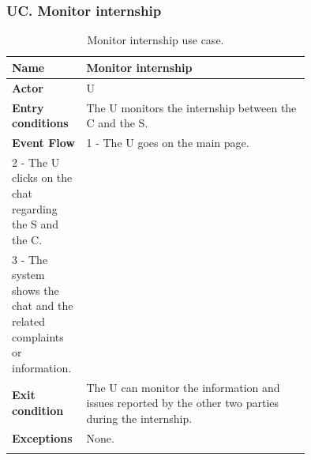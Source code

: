 \subsubsection*{UC\cuc . Monitor internship}
\begin{center}
    \begin{longtable}{|l|p{0.75\linewidth}|}
        \hline
        \textbf{Name}               & Monitor internship\\
        \hline
        \textbf{Actor}              & U\\
        \hline
        \textbf{Entry conditions}   & The U monitors the internship between the C and the S.\\
        \hline
        \textbf{Event Flow}         & 
        1 - The U goes on the main page. \\
        2 - The U clicks on the chat regarding the S and the C. \\
        3 - The system shows the chat and the related complaints or information. \\
        \hline
        \textbf{Exit condition}   & The U can monitor the information and issues reported by the other two parties during the internship. \\       
        \hline
        \textbf{Exceptions}       & None. \\
        \hline
        \caption{Monitor internship use case.}
        \label{tab: monitor_internship_use_case}
    \end{longtable}
\end{center}


